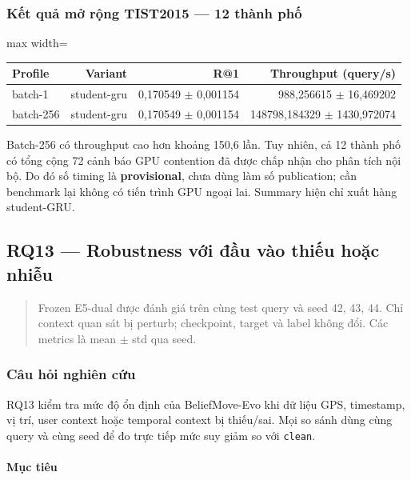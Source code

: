 \subsubsection*{Kết quả mở rộng TIST2015 --- 12 thành phố}

\begin{table}[!htbp]
\centering
\scriptsize
\setlength{\tabcolsep}{2.5pt}
\begin{adjustbox}{max width=\textwidth}
\begin{tabular}{@{}lrrr@{}}
\toprule
Profile & Variant & R@1 & Throughput (query/s) \\
\midrule
batch-1 & student-gru & 0,170549 $\pm$ 0,001154 & 988,256615 $\pm$ 16,469202 \\
batch-256 & student-gru & 0,170549 $\pm$ 0,001154 & 148798,184329 $\pm$ 1430,972074 \\
\bottomrule
\end{tabular}
\end{adjustbox}
\end{table}

Batch-256 có throughput cao hơn khoảng 150,6 lần. Tuy nhiên, cả 12 thành phố có tổng cộng 72 cảnh báo GPU contention đã được chấp nhận cho phân tích nội bộ. Do đó số timing là \textbf{provisional}, chưa dùng làm số publication; cần benchmark lại không có tiến trình GPU ngoại lai. Summary hiện chỉ xuất hàng student-GRU.


\subsection{RQ13 --- Robustness với đầu vào thiếu hoặc nhiễu}

\begin{quote}\small Frozen E5-dual được đánh giá trên cùng test query và seed 42, 43, 44. Chỉ context quan sát bị perturb; checkpoint, target và label không đổi. Các metrics là mean $\pm$ std qua seed.\end{quote}
\subsubsection*{Câu hỏi nghiên cứu}

RQ13 kiểm tra mức độ ổn định của BeliefMove-Evo khi dữ liệu GPS, timestamp, vị trí, user context hoặc temporal context bị thiếu/sai. Mọi so sánh dùng cùng query và cùng seed để đo trực tiếp mức suy giảm so với \texttt{clean}.

\paragraph{Mục tiêu}


